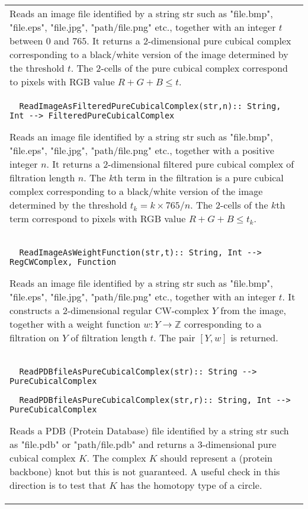 \documentclass[a4paper,11pt]{report}
\begin{document}
{\begin{center}
\begin{tabular}{|l|}
 Reads an image file identified by a string str such as "file.bmp", "file.eps",
"file.jpg", "path/file.png" etc., together with an integer $t$ between $0$ and $765$. It returns a $2$-dimensional pure cubical complex corresponding to a black/white version of
the image determined by the threshold $t$. The $2$-cells of the pure cubical complex correspond to pixels with RGB value $R+G+B \le t$. \\
 \index{ReadImageAsFilteredPureCubicalComplex} 
\begin{verbatim}  ReadImageAsFilteredPureCubicalComplex(str,n):: String, Int --> FilteredPureCubicalComplex
\end{verbatim}


 

 Reads an image file identified by a string str such as "file.bmp", "file.eps",
"file.jpg", "path/file.png" etc., together with a positive integer $n$. It returns a $2$-dimensional filtered pure cubical complex of filtration length $n$. The $k$th term in the filtration is a pure cubical complex corresponding to a
black/white version of the image determined by the threshold $t_k=k \times 765/n $. The $2$-cells of the $k$th term correspond to pixels with RGB value $R+G+B \le t_k$. \\
 \index{ReadImageAsWeightFunction} 
\begin{verbatim}  ReadImageAsWeightFunction(str,t):: String, Int --> RegCWComplex, Function
\end{verbatim}


 

 Reads an image file identified by a string str such as "file.bmp", "file.eps",
"file.jpg", "path/file.png" etc., together with an integer $t$. It constructs a $2$-dimensional regular CW-complex $Y$ from the image, together with a weight function $w\colon Y\rightarrow \mathbb Z$ corresponding to a filtration on $Y$ of filtration length $t$. The pair $[Y,w]$ is returned. \\
 \index{ReadPDBfileAsPureCubicalComplex} 
\begin{verbatim}  ReadPDBfileAsPureCubicalComplex(str):: String --> PureCubicalComplex
\end{verbatim}
 
\begin{verbatim}  ReadPDBfileAsPureCubicalComplex(str,r):: String, Int --> PureCubicalComplex
\end{verbatim}


 

 Reads a PDB (Protein Database) file identified by a string str such as
"file.pdb" or "path/file.pdb" and returns a $3$-dimensional pure cubical complex $K$. The complex $K$ should represent a (protein backbone) knot but this is not guaranteed. A
useful check in this direction is to test that $K$ has the homotopy type of a circle. 


\end{tabular}
\end{center}}
\end{document}
